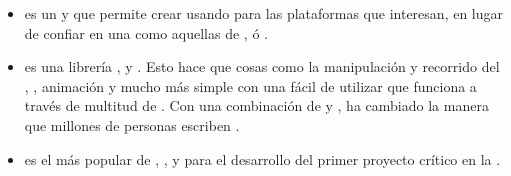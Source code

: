 \begin{itemize}
		\item
			\textbf{\phonegapNAME} es un \frameworkPC \freePC y \openSourcePC que permite crear \appsINT \mobileINT usando \webINT \apisAS para las plataformas que interesan, en lugar de confiar en una \apisAS \platformSpecificCPT como aquellas de \iosNAME, \windowsPhoneNAME ó \androidNAME \cite{online_technology_phonegap_mobile_app_plataforms}.


		\item
			\textbf{\jqueryNAME} es una librería \javaScriptNAME \fastQA, \smallQA y \featureRichQA. Esto hace que cosas como la manipulación y recorrido del \htmlDocumentINT, \eventHandlingPL, animación y \ajaxNAME mucho más simple con una \apisAS fácil de utilizar que funciona a través de multitud de \browsersINT. Con una combinación de \versatilityQA y \extensibilityQA, \jqueryNAME ha cambiado la manera que millones de personas escriben \javaScriptNAME \cite{online_technology_jquery_officialSite}.
		
		\item \textbf{\bootstrap} es el \frameworkPC más popular de \htmlNAME, \cssNAME, y \javaScriptNAME para el desarrollo del primer proyecto \mobileINT crítico en la \webINT \cite{technology_bootstrap}.
	\end{itemize}

